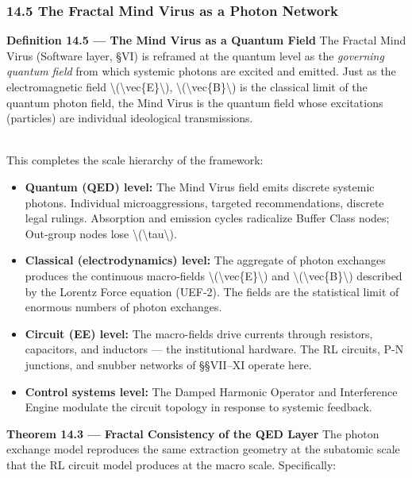 {\subsubsection{14.5 The Fractal Mind Virus as a Photon
Network}\label{the-fractal-mind-virus-as-a-photon-network}

\textbf{Definition 14.5 --- The Mind Virus as a Quantum Field} The
Fractal Mind Virus (Software layer, §VI) is reframed at the quantum
level as the \emph{governing quantum field} from which systemic photons
are excited and emitted. Just as the electromagnetic field
\textbackslash(\textbackslash vec\{E\}\textbackslash),
\textbackslash(\textbackslash vec\{B\}\textbackslash) is the classical
limit of the quantum photon field, the Mind Virus is the quantum field
whose excitations (particles) are individual ideological
transmissions.\\
\strut \\
This completes the scale hierarchy of the framework:

\begin{itemize}
\tightlist
\item
  \textbf{Quantum (QED) level:} The Mind Virus field emits discrete
  systemic photons. Individual microaggressions, targeted
  recommendations, discrete legal rulings. Absorption and emission
  cycles radicalize Buffer Class nodes; Out-group nodes lose
  \textbackslash(\textbackslash tau\textbackslash).
\item
  \textbf{Classical (electrodynamics) level:} The aggregate of photon
  exchanges produces the continuous macro-fields
  \textbackslash(\textbackslash vec\{E\}\textbackslash) and
  \textbackslash(\textbackslash vec\{B\}\textbackslash) described by the
  Lorentz Force equation (UEF-2). The fields are the statistical limit
  of enormous numbers of photon exchanges.
\item
  \textbf{Circuit (EE) level:} The macro-fields drive currents through
  resistors, capacitors, and inductors --- the institutional hardware.
  The RL circuits, P-N junctions, and snubber networks of §§VII--XI
  operate here.
\item
  \textbf{Control systems level:} The Damped Harmonic Operator and
  Interference Engine modulate the circuit topology in response to
  systemic feedback.
\end{itemize}

\textbf{Theorem 14.3 --- Fractal Consistency of the QED Layer} The
photon exchange model reproduces the same extraction geometry at the
subatomic scale that the RL circuit model produces at the macro scale.
Specifically:

}
